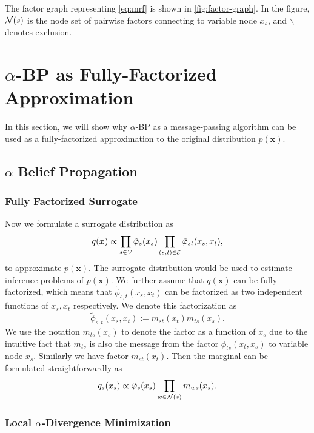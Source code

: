 \documentclass[conference,onecolumn]{IEEEtran}
\begin{document}
The factor graph representing \autoref{eq:mrf} is shown in
\autoref{fig:factor-graph}. In the figure, $\mathcal{N}(s)$ is the node set of
pairwise factors connecting to variable node $x_s$, and $\backslash$ denotes exclusion.

\section{$\alpha$-BP as Fully-Factorized Approximation}
In this section, we will show why $\alpha$-BP as a message-passing algorithm can be used as a fully-factorized approximation to the original distribution $p(\bm{x})$. 




\subsection{$\alpha$ Belief Propagation}
\subsubsection{Fully Factorized Surrogate}
Now we formulate a surrogate distribution as
\begin{equation}
  q(\bm{x}) \propto \prod_{{s\in \mathcal{V}}} \tilde{\varphi}_s(x_s) \prod_{(s,t) \in \mathcal{E}} \tilde{\varphi}_{st}(x_s, x_t),
\end{equation}
to approximate $p(\bm{x})$. The surrogate distribution would be used to estimate inference problems of $p(\bm{x})$. We further assume that $q(\bm{x})$ can be fully factorized, which means that $\tilde{\phi}_{s,t}(x_s, x_t)$ can be factorized as two independent functions of $x_s, x_t$ respectively. We denote this factorization as
\begin{equation}
  \tilde{\phi}_{s,t}(x_s, x_t) := m_{st}(x_t) m_{ts}(x_s).
\end{equation}
We use the notation $m_{ts}(x_s)$ to denote the factor as a function of $x_s$ due to the intuitive fact that $m_{ts}$ is also the message from the factor $\phi_{ts}(x_t, x_s)$ to variable node $x_s$. Similarly we have factor $m_{st}(x_t)$. Then the marginal can be formulated straightforwardly as
\begin{equation}
  q_s(x_s) \propto \tilde{\varphi}_s(x_s) \prod_{w\in \mathcal{N}(s)} m_{ws}(x_s).
\end{equation}

\subsubsection{Local $\alpha$-Divergence Minimization}
\end{document}
